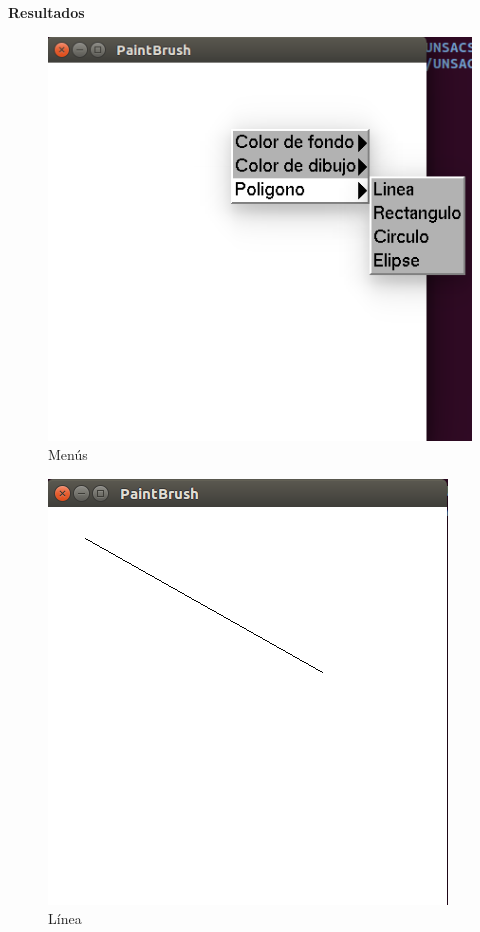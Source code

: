 \documentclass[a4paper,12pt]{article}
\begin{document}
\begin{large}
 \textbf{Resultados}
\end{large}


\begin{figure}[H]
 \centering
 \includegraphics[scale = 0.5]{1.png}
 \caption{Menús}
\end{figure}
\begin{figure}[H]
 \centering
 \includegraphics[scale = 0.5]{2.png}
 \caption{Línea}
\end{figure}
\end{document}
